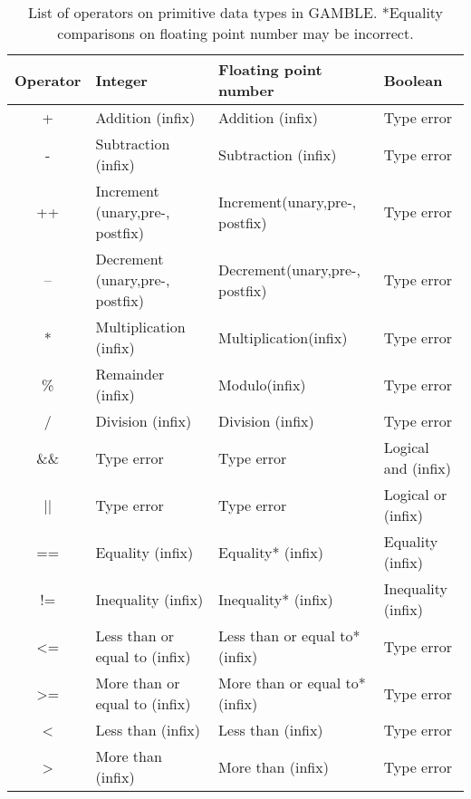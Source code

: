 \begin{table}[h]
    \centering
    \begin{tabular}{|c|l|l|l|}
    \hline
    \textbf{Operator}  & \textbf{Integer}                   & \textbf{Floating point number}    & \textbf{Boolean}           \\ \hline
    +                  & Addition (infix)                   & Addition (infix)                  & Type error          \\ \hline 
    -                  & Subtraction (infix)                & Subtraction (infix)               & Type error          \\ \hline 
    ++                 & Increment (unary,pre-, postfix)    & Increment(unary,pre-, postfix)    & Type error   \\ \hline    
    --                 & Decrement (unary,pre-, postfix)    & Decrement(unary,pre-, postfix)    & Type error  \\ \hline
    *                  & Multiplication (infix)             & Multiplication(infix)             & Type error                  \\ \hline
    \%                 & Remainder (infix)                  & Modulo(infix)                     & Type error              \\ \hline
    /                  & Division (infix)                   & Division (infix)                  & Type error  \\ \hline
    \&\&               & Type error                         & Type error                        & Logical and (infix) \\ \hline 
    ||                 & Type error                         & Type error                        & Logical or (infix) \\ \hline 
    ==                 & Equality (infix)                   & Equality* (infix)                 & Equality (infix) \\ \hline 
    !=                 & Inequality (infix)                 & Inequality* (infix)               & Inequality (infix) \\ \hline
    <=                 & Less than or equal to (infix)      & Less than or equal to* (infix)    & Type error \\ \hline
    >=                 & More than or equal to (infix)      & More than or equal to* (infix)    & Type error \\ \hline
    <                  & Less than (infix)                  & Less than (infix)                 & Type error \\ \hline
    >                  & More than (infix)                  & More than (infix)                 & Type error \\ \hline    


    \end{tabular}
    \caption{List of operators on primitive data types in GAMBLE. *Equality comparisons on floating point number may be incorrect.}
    \label{tbl:operators}
\end{table}
\vspace{-20pt}